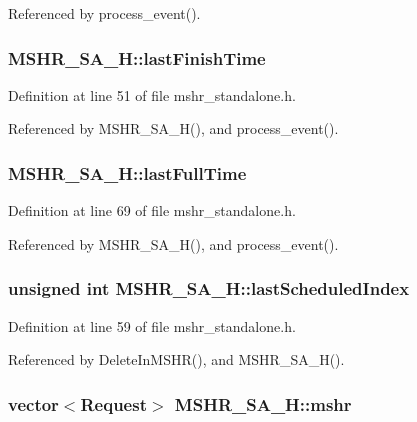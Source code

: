 Referenced by process\_\-event().
\subsubsection[{lastFinishTime}]{ {\bf MSHR\_\-SA\_\-H::lastFinishTime}}\label{classMSHR__SA__H_ad74703cf078680815bd71f18e0d3682}




Definition at line 51 of file mshr\_\-standalone.h.

Referenced by MSHR\_\-SA\_\-H(), and process\_\-event().
\subsubsection[{lastFullTime}]{ {\bf MSHR\_\-SA\_\-H::lastFullTime}}\label{classMSHR__SA__H_fd25220bddfe99fd3285eafcd0991dc1}




Definition at line 69 of file mshr\_\-standalone.h.

Referenced by MSHR\_\-SA\_\-H(), and process\_\-event().
\subsubsection[{lastScheduledIndex}]{\setlength{\rightskip}{0pt plus 5cm}unsigned int {\bf MSHR\_\-SA\_\-H::lastScheduledIndex}}\label{classMSHR__SA__H_510b4fd98e266c76623a63a21c1f7b0b}




Definition at line 59 of file mshr\_\-standalone.h.

Referenced by DeleteInMSHR(), and MSHR\_\-SA\_\-H().
\subsubsection[{mshr}]{\setlength{\rightskip}{0pt plus 5cm}vector$<${\bf Request}$>$ {\bf MSHR\_\-SA\_\-H::mshr}}\label{classMSHR__SA__H_e12cce92dbec085527bffd35fbebdcd0}




